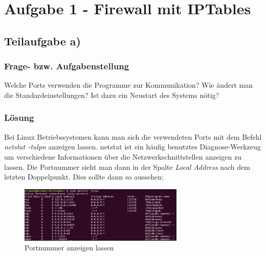 \newcommand{\env}[1]{\texttt{#1}}
\newcommand{\command}[1]{\texttt{#1}}
\newcommand{\package}[1]{\texttt{\itshape#1}}
\newcommand{\engl}[1]{(engl: \textit{#1})\xspace}
\setlength{\parindent}{0pt}
\lstset{extendedchars=\true}
\lstset{inputencoding=ansinew}
\newcommand\tab[1][1cm]{\hspace*{#1}}
\newpage

\section{Aufgabe 1 - Firewall mit IPTables}

\subsection{Teilaufgabe a)}

\subsubsection{Frage- bzw. Aufgabenstellung}

Welche Ports verwenden die Programme zur Kommunikation? Wie ändert man die Standardeinstellungen? Ist dazu ein Neustart des Systems nötig?

\subsubsection{Lösung}

Bei Linux Betriebssystemen kann man sich  die verwendeten Ports mit dem Befehl \textit{netstat -tulpn} anzeigen lassen. netstat ist ein häufig benutztes Diagnose-Werkzeug um verschiedene Informationen über die Netzwerkschnittstellen anzeigen zu lassen. Die Portnummer sieht man dann in der Spalte \textit{Local Address} nach dem letzten Doppelpunkt. Dies sollte dann so aussehen: 

\begin{figure}[htbp]
\begin{center}
\includegraphics[width=0.7\textwidth]{Bild1}
\caption{Portnummer anzeigen lassen}
\end{center}
\end{figure}

